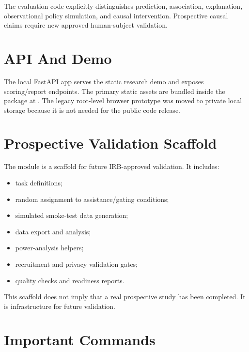 \documentclass[11pt]{article}
\begin{document}
The evaluation code explicitly distinguishes prediction, association, explanation, observational policy simulation, and causal intervention. Prospective causal claims require new approved human-subject validation.

\section*{API And Demo}

The local FastAPI app serves the static research demo and exposes scoring/report endpoints. The primary static assets are bundled inside the package at . The legacy root-level browser prototype was moved to private local storage because it is not needed for the public code release.

\section*{Prospective Validation Scaffold}

The  module is a scaffold for future IRB-approved validation. It includes:

\begin{itemize}[leftmargin=*]
  \item task definitions;
  \item random assignment to assistance/gating conditions;
  \item simulated smoke-test data generation;
  \item data export and analysis;
  \item power-analysis helpers;
  \item recruitment and privacy validation gates;
  \item quality checks and readiness reports.
\end{itemize}

This scaffold does not imply that a real prospective study has been completed. It is infrastructure for future validation.

\section*{Important Commands}
\end{document}
